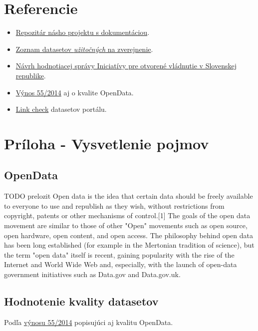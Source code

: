 \documentclass[12pt,a4paper]{article}
\begin{document}
\section{Referencie} 
\begin{itemize} 
  \item \label{proj} \href{https://github.com/koniiiik/opendata-sk-ias}{Repozitár násho projektu s dokumentáciou}. %
  \item \label{525} \href{http://www.otvorenavlada.gov.sk/datasety-statnej-spravy/}{Zoznam datasetov \emph{užitočných} na zverejnenie}.
  \item \label{hodnotenie} \href{http://www.otvorenavlada.gov.sk/navrh-hodnotiacej-spravy-iniciativy-pre-otvorene-vladnutie-v-slovenskej-republike/}{Návrh hodnotiacej správy Iniciatívy pre otvorené vládnutie v Slovenskej republike}.
  \item \label{kvalita} \href{http://www.zbierka.sk/sk/predpisy/55-2014-z-z.p-35621.pdf}{Výnos 55/2014} aj o kvalite OpenData. 
  \item \label{hany} \href{https://github.com/hanecak/data.gov.sk-link-check/}{Link check} datasetov portálu. 
\end{itemize} 


\section{Príloha - Vysvetlenie pojmov}
\subsection{OpenData} 
\label{opendata} 
TODO prelozit 
Open data is the idea that certain data should be freely available to everyone to use and republish as they wish, without restrictions from copyright, patents or other mechanisms of control.[1] The goals of the open data movement are similar to those of other "Open" movements such as open source, open hardware, open content, and open access. The philosophy behind open data has been long established (for example in the Mertonian tradition of science), but the term "open data" itself is recent, gaining popularity with the rise of the Internet and World Wide Web and, especially, with the launch of open-data government initiatives such as Data.gov and Data.gov.uk.


\subsection{Hodnotenie kvality datasetov}
\label{zakon-kvalita} 
Podľa \href{http://www.zbierka.sk/sk/predpisy/55-2014-z-z.p-35621.pdf}{výnosu 55/2014} popisujúci aj kvalitu OpenData. 
\end{document}
